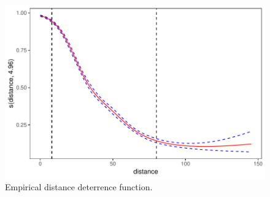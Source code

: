 \documentclass[fleqn,10pt]{wlscirep}
\begin{document}

\begin{figure}[!htbp]
\centering
\includegraphics[width=.8\linewidth]{figures/distance_function.pdf}
\caption{Empirical distance deterrence function.}
\label{fig:distance}
\end{figure}
\end{document}
